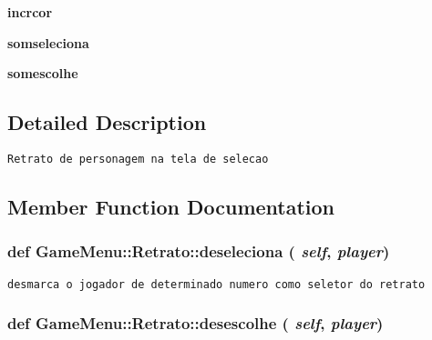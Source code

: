 \begin{CompactItemize}
\item 
\hypertarget{class_game_menu_1_1_retrato_782cafc8b3ffa85c402ce8b4ba0d47f1}{
\textbf{incrcor}}
\label{class_game_menu_1_1_retrato_782cafc8b3ffa85c402ce8b4ba0d47f1}

\item 
\hypertarget{class_game_menu_1_1_retrato_59d363c239394408e3d0044fd49da397}{
\textbf{somseleciona}}
\label{class_game_menu_1_1_retrato_59d363c239394408e3d0044fd49da397}

\item 
\hypertarget{class_game_menu_1_1_retrato_a373dd2c467f4cb367de63717c0e2407}{
\textbf{somescolhe}}
\label{class_game_menu_1_1_retrato_a373dd2c467f4cb367de63717c0e2407}

\end{CompactItemize}


\subsection{Detailed Description}


\begin{footnotesize}\begin{verbatim}Retrato de personagem na tela de selecao \end{verbatim}
\end{footnotesize}
 

\subsection{Member Function Documentation}
\hypertarget{class_game_menu_1_1_retrato_bd603f60d346119ab1865ca121da3578}{
\subsubsection[{deseleciona}]{\setlength{\rightskip}{0pt plus 5cm}def GameMenu::Retrato::deseleciona ( {\em self}, \/   {\em player})}}
\label{class_game_menu_1_1_retrato_bd603f60d346119ab1865ca121da3578}




\begin{footnotesize}\begin{verbatim}desmarca o jogador de determinado numero como seletor do retrato \end{verbatim}
\end{footnotesize}
 \hypertarget{class_game_menu_1_1_retrato_ae51d63e97f0d84006ca71fa83abb619}{
\subsubsection[{desescolhe}]{\setlength{\rightskip}{0pt plus 5cm}def GameMenu::Retrato::desescolhe ( {\em self}, \/   {\em player})}}
\label{class_game_menu_1_1_retrato_ae51d63e97f0d84006ca71fa83abb619}




